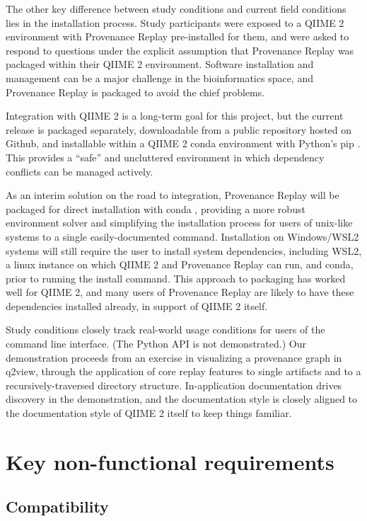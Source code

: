The other key difference between study conditions and current field conditions
lies in the installation process. Study participants were exposed to a QIIME 2
environment with Provenance Replay pre-installed for them, and were asked to
respond to questions under the explicit assumption that Provenance Replay was
packaged within their QIIME 2 environment. Software installation and management
can be a major challenge in the bioinformatics space, and Provenance Replay is
packaged to avoid the chief problems.

Integration with QIIME 2 is a long-term goal for this project, but the current
release is packaged separately, downloadable from a public repository hosted on
Github, and installable within a QIIME 2 conda environment with Python’s
pip \parencite{the_pip_developers_pip_2008}. This provides a “safe” and
uncluttered environment in which dependency conflicts can be managed actively.

As an interim solution on the road to integration, Provenance Replay will be
packaged for direct installation with conda \parencite{anaconda_inc_anaconda_2022},
providing a more robust environment solver and simplifying the installation
process for users of unix-like systems to a single easily-documented command.
Installation on Windows/WSL2 systems will still require the user to install
system dependencies, including WSL2, a linux instance on which QIIME 2 and
Provenance Replay can run, and conda, prior to running the install command. This
approach to packaging has worked well for QIIME 2, and many users of Provenance
Replay are likely to have these dependencies installed already, in support of
QIIME 2 itself.

Study conditions closely track real-world usage conditions for users of the
command line interface. (The Python API is not demonstrated.) Our demonstration
proceeds from an exercise in visualizing a provenance graph in q2view, through
the application of core replay features to single artifacts and to a
recursively-traversed directory structure. In-application documentation drives
discovery in the demonstration, and the documentation style is closely aligned
to the documentation style of QIIME 2 itself to keep things familiar. 

\section{Key non-functional requirements}

\subsection{Compatibility}

